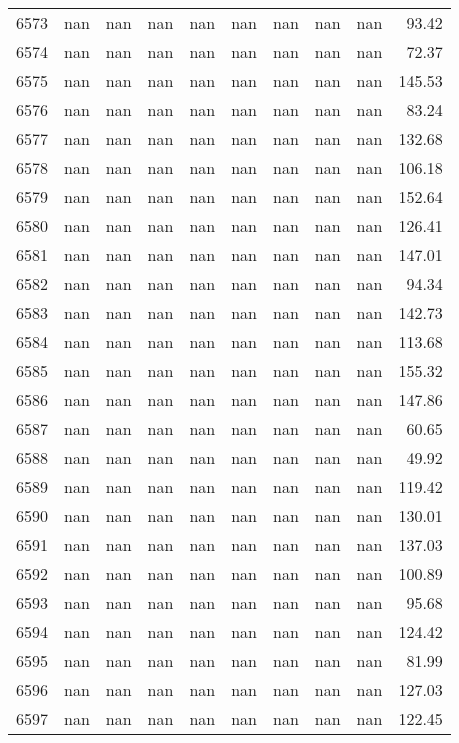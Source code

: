 \begin{tabular}{lrrrrrrrrr}
6573 & nan & nan & nan & nan & nan & nan & nan & nan & 93.42 \\
6574 & nan & nan & nan & nan & nan & nan & nan & nan & 72.37 \\
6575 & nan & nan & nan & nan & nan & nan & nan & nan & 145.53 \\
6576 & nan & nan & nan & nan & nan & nan & nan & nan & 83.24 \\
6577 & nan & nan & nan & nan & nan & nan & nan & nan & 132.68 \\
6578 & nan & nan & nan & nan & nan & nan & nan & nan & 106.18 \\
6579 & nan & nan & nan & nan & nan & nan & nan & nan & 152.64 \\
6580 & nan & nan & nan & nan & nan & nan & nan & nan & 126.41 \\
6581 & nan & nan & nan & nan & nan & nan & nan & nan & 147.01 \\
6582 & nan & nan & nan & nan & nan & nan & nan & nan & 94.34 \\
6583 & nan & nan & nan & nan & nan & nan & nan & nan & 142.73 \\
6584 & nan & nan & nan & nan & nan & nan & nan & nan & 113.68 \\
6585 & nan & nan & nan & nan & nan & nan & nan & nan & 155.32 \\
6586 & nan & nan & nan & nan & nan & nan & nan & nan & 147.86 \\
6587 & nan & nan & nan & nan & nan & nan & nan & nan & 60.65 \\
6588 & nan & nan & nan & nan & nan & nan & nan & nan & 49.92 \\
6589 & nan & nan & nan & nan & nan & nan & nan & nan & 119.42 \\
6590 & nan & nan & nan & nan & nan & nan & nan & nan & 130.01 \\
6591 & nan & nan & nan & nan & nan & nan & nan & nan & 137.03 \\
6592 & nan & nan & nan & nan & nan & nan & nan & nan & 100.89 \\
6593 & nan & nan & nan & nan & nan & nan & nan & nan & 95.68 \\
6594 & nan & nan & nan & nan & nan & nan & nan & nan & 124.42 \\
6595 & nan & nan & nan & nan & nan & nan & nan & nan & 81.99 \\
6596 & nan & nan & nan & nan & nan & nan & nan & nan & 127.03 \\
6597 & nan & nan & nan & nan & nan & nan & nan & nan & 122.45 \\

\end{tabular}
